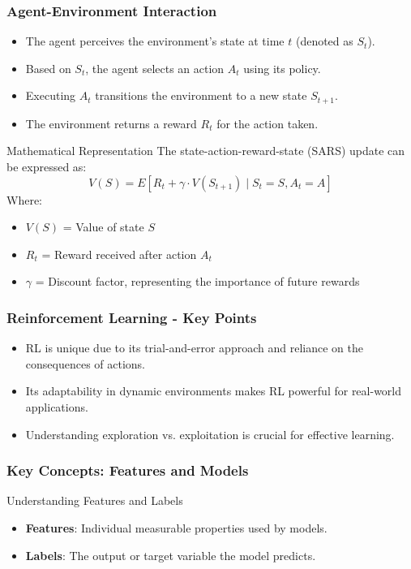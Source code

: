 \documentclass[aspectratio=169]{beamer}
\begin{document}
\begin{frame}[fragile]
    \frametitle{Agent-Environment Interaction}
    \begin{itemize}
        \item The agent perceives the environment's state at time $t$ (denoted as $S_t$).
        \item Based on $S_t$, the agent selects an action $A_t$ using its policy.
        \item Executing $A_t$ transitions the environment to a new state $S_{t+1}$.
        \item The environment returns a reward $R_t$ for the action taken.
    \end{itemize}

    \begin{block}{Mathematical Representation}
        The state-action-reward-state (SARS) update can be expressed as:
        \begin{equation}
            V(S) = E[R_t + \gamma \cdot V(S_{t+1}) \mid S_t = S, A_t = A]
        \end{equation}
        Where:
        \begin{itemize}
            \item $V(S)$ = Value of state $S$
            \item $R_t$ = Reward received after action $A_t$
            \item $\gamma$ = Discount factor, representing the importance of future rewards
        \end{itemize}
    \end{block}
\end{frame}

\begin{frame}[fragile]
    \frametitle{Reinforcement Learning - Key Points}
    \begin{itemize}
        \item RL is unique due to its trial-and-error approach and reliance on the consequences of actions.
        \item Its adaptability in dynamic environments makes RL powerful for real-world applications.
        \item Understanding exploration vs. exploitation is crucial for effective learning.
    \end{itemize}
\end{frame}

\begin{frame}[fragile]
    \frametitle{Key Concepts: Features and Models}
    \begin{block}{Understanding Features and Labels}
        \begin{itemize}
            \item \textbf{Features}: Individual measurable properties used by models.
            \item \textbf{Labels}: The output or target variable the model predicts.
        \end{itemize}
    \end{block}
\end{frame}
\end{document}
